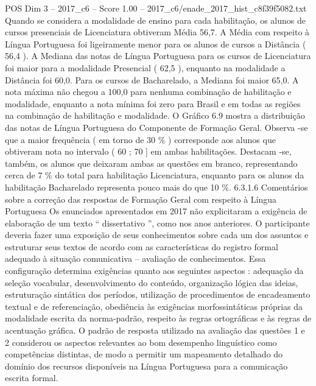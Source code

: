 \begin{textsample}{POS Dim 3 – 2017\_c6 – Score 1.00 – 2017\_c6/enade\_2017\_hist\_c8f39f5082.txt}
Quando se considera a modalidade de ensino para cada habilitação, os alunos de cursos presenciais de Licenciatura obtiveram Média 56,7.
A Média com respeito à Língua Portuguesa foi ligeiramente menor para os alunos de cursos a Distância ( 56,4 ).
A Mediana das notas de Língua Portuguesa para os cursos de Licenciatura foi maior para a modalidade Presencial ( 62,5 ), enquanto na modalidade a Distância foi 60,0.
Para os cursos de Bacharelado, a Mediana foi maior 65,0.
A nota máxima não chegou a 100,0 para nenhuma combinação de habilitação e modalidade, enquanto a nota mínima foi zero para Brasil e em todas as regiões na combinação de habilitação e modalidade.
O Gráfico 6.9 mostra a distribuição das notas de Língua Portuguesa do Componente de Formação Geral.
Observa -se que a maior frequência ( em torno de 30 \% ) corresponde aos alunos que obtiveram nota no intervalo ( 60 ; 70 ] em ambas habilitações.
Destacam -se, também, os alunos que deixaram ambas as questões em branco, representando cerca de 7 \% do total para habilitação Licenciatura, enquanto para os alunos da habilitação Bacharelado representa pouco mais do que 10 \%. 6.3.1.6 Comentários sobre a correção das respostas de Formação Geral com respeito à Língua Portuguesa Os enunciados apresentados em 2017 não explicitaram a exigência de elaboração de um texto “ dissertativo ”, como nos anos anteriores.
O participante deveria fazer uma exposição de seus conhecimentos sobre cada um dos assuntos e estruturar seus textos de acordo com as características do registro formal adequado à situação comunicativa – avaliação de conhecimentos.
Essa configuração determina exigências quanto aos seguintes aspectos : adequação da seleção vocabular, desenvolvimento do conteúdo, organização lógica das ideias, estruturação sintática dos períodos, utilização de procedimentos de encadeamento textual e de referenciação, obediência às exigências morfossintáticas próprias da modalidade escrita da norma-padrão, respeito às regras ortográficas e às regras de acentuação gráfica.
O padrão de resposta utilizado na avaliação das questões 1 e 2 considerou os aspectos relevantes ao bom desempenho linguístico como competências distintas, de modo a permitir um mapeamento detalhado do domínio dos recursos disponíveis na Língua Portuguesa para a comunicação escrita formal.

\end{textsample}
